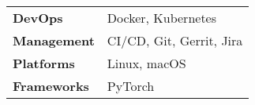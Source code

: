 

\begin{cvparagraph}

\vspace*{0.2cm}

\begin{tabularx}{\linewidth}{@{}lX}
    \textbf{DevOps}      & Docker, Kubernetes \\
    \textbf{Management}  & CI/CD, Git, Gerrit, Jira \\
    \textbf{Platforms}   & Linux, macOS \\
    \textbf{Frameworks}  & PyTorch
 \end{tabularx}

\end{cvparagraph}
